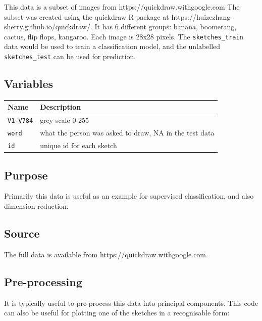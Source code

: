 \documentclass[
  letterpaper,
]{book}
\begin{document}
This data is a subset of images from https://quickdraw.withgoogle.com
The subset was created using the quickdraw R package at
https://huizezhang-sherry.github.io/quickdraw/. It has 6 different
groups: banana, boomerang, cactus, flip flops, kangaroo. Each image is
28x28 pixels. The \texttt{sketches\_train} data would be used to train a
classification model, and the unlabelled \texttt{sketches\_test} can be
used for prediction.

\hypertarget{variables-5}{%
\subsection*{Variables}\label{variables-5}}

\begin{longtable}[]{@{}ll@{}}
\toprule()
Name & Description \\
\midrule()
\endhead
\texttt{V1-V784} & grey scale 0-255 \\
\texttt{word} & what the person was asked to draw, NA in the test
data \\
\texttt{id} & unique id for each sketch \\
\bottomrule()
\end{longtable}

\hypertarget{purpose-5}{%
\subsection*{Purpose}\label{purpose-5}}

Primarily this data is useful as an example for supervised
classification, and also dimension reduction.

\hypertarget{source-5}{%
\subsection*{Source}\label{source-5}}

The full data is available from https://quickdraw.withgoogle.com.

\hypertarget{pre-processing-5}{%
\subsection*{Pre-processing}\label{pre-processing-5}}

It is typically useful to pre-process this data into principal
components. This code can also be useful for plotting one of the
sketches in a recognisable form:
\end{document}

